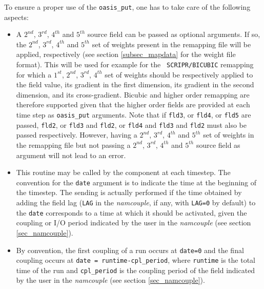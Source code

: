 To ensure a proper use of the {\tt oasis\_put}, one has to take care
of the following aspects:

\begin{itemize}

\item A $2^{nd}$, $3^{rd}$, $4^{th}$ and $5^{th}$ source field can be
  passed as optional arguments. If so, the $2^{nd}$, $3^{rd}$,
  $4^{th}$ and $5^{th}$ set of weights present in the remapping file
  will be applied, respectively (see section \ref{subsec_mapdata} for
  the weight file format). This will be used for example for the {\tt
    SCRIPR/BICUBIC} remapping for which a $1^{st}$, $2^{nd}$,
  $3^{rd}$, $4^{th}$ set of weights should be respectively applied to
  the field value, its gradient in the first dimension, its gradient
  in the second dimension, and its cross-gradient. Bicubic and higher order
  remapping are therefore supported given that the higher order fields
  are provided at each time step as {\tt oasis\_put} arguments. Note
  that if {\tt fld3}, or {\tt fld4}, or {\tt fld5} are passed, {\tt fld2}, or {\tt fld3} and {\tt fld2}, or {\tt fld4} and {\tt fld3} and {\tt fld2} must also be passed respectively. However, having a $2^{nd}$, $3^{rd}$, $4^{th}$
  and $5^{th}$ set of weights in the remapping file but not passing a
  $2^{nd}$, $3^{rd}$, $4^{th}$ and $5^{th}$ source field as argument
  will not lead to an error.


\item This routine may be called by the component at each timestep. The
  convention for the {\tt date} argument is to indicate the time at
  the beginning of the timestep. The sending is actually performed
  if the time obtained by adding the field lag ({\tt LAG} in the
  {\em namcouple}, if any, with {\tt LAG=0} by default) to the {\tt date} corresponds to a time at which it
  should be activated, given the coupling or I/O period indicated by
  the user in the {\it namcouple} (see section \ref{sec_namcouple}).

\item By convention, the first coupling
  of a run occurs at {\tt date=0} and the final coupling occurs
  at {\tt date = runtime-cpl\_period}, where {\tt runtime} is the total time of
  the run and {\tt cpl\_period} is the coupling period of the field indicated by
  the user in the {\it namcouple} (see section \ref{sec_namcouple}).


\end{itemize}
